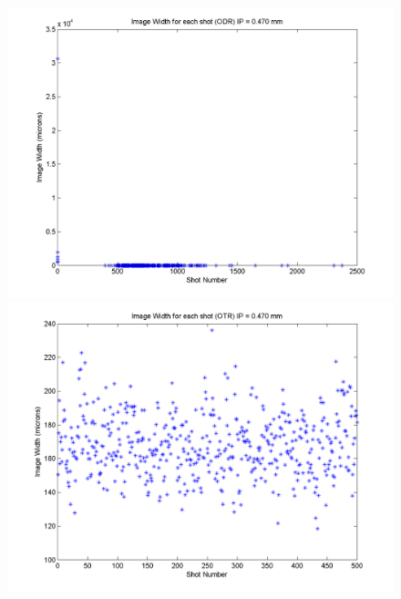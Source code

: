 \documentclass[12pt]{article}
\begin{document}
\begin{figure}
\begin{center}
\includegraphics[scale=0.5]{Figures/ImageWidth_ODR_470.PNG}
\includegraphics[scale=0.5]{Figures/ImageWidth_OTR_470.PNG}
\caption{}
\end{center}
\end{figure}
\end{document}
